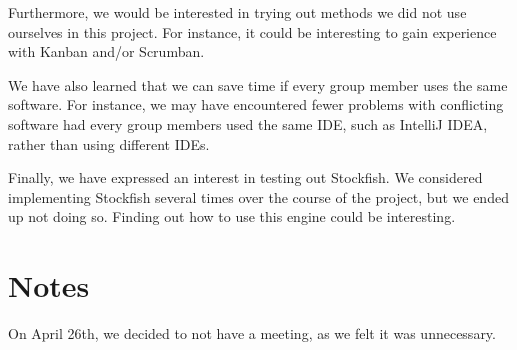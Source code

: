 \documentclass[12pt, a4paper]{article}
\begin{document}
Furthermore, we would be interested in trying out methods we did not use ourselves in this project. For instance, it could be interesting to gain experience with Kanban and/or Scrumban.

We have also learned that we can save time if every group member uses the same software. For instance, we may have encountered fewer problems with conflicting software had every group members used the same IDE, such as IntelliJ IDEA, rather than using different IDEs.

Finally, we have expressed an interest in testing out Stockfish. We considered implementing Stockfish several times over the course of the project, but we ended up not doing so. Finding out how to use this engine could be interesting.

\section*{Notes}
On April 26th, we decided to not have a meeting, as we felt it was unnecessary.
\end{document}
